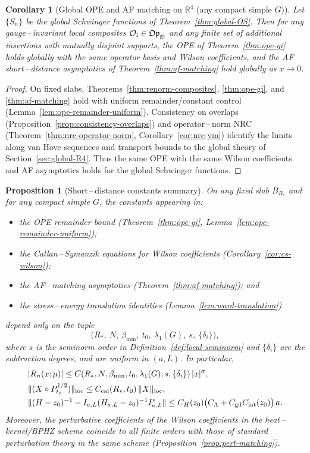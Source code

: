 \documentclass[11pt]{amsart}
\theoremstyle{plain}
\newtheorem{proposition}[theorem]{Proposition}
\newtheorem{corollary}[theorem]{Corollary}
\theoremstyle{definition}
\theoremstyle{remark}
\begin{document}
\begin{corollary}[Global OPE and AF matching on $\mathbb R^4$ (any compact simple $G$)]\label{cor:global-ope}
Let $\{S_n\}$ be the global Schwinger functions of Theorem~\ref{thm:global-OS}. Then for any gauge\,–\,invariant local composites $\mathcal O_i\in\mathfrak{Op}_{\rm gi}$ and any finite set of additional insertions with mutually disjoint supports, the OPE of Theorem~\ref{thm:ope-gi} holds globally with the same operator basis and Wilson coefficients, and the AF short\,–\,distance asymptotics of Theorem~\ref{thm:af-matching} hold globally as $x\to 0$.
\end{corollary}
\begin{proof}
On fixed slabs, Theorems~\ref{thm:renorm-composites}, \ref{thm:ope-gi}, and \ref{thm:af-matching} hold with uniform remainder/constant control (Lemma~\ref{lem:ope-remainder-uniform}). Consistency on overlaps (Proposition~\ref{prop:consistency-overlaps}) and operator\,–\,norm NRC (Theorem~\ref{thm:nrc-operator-norm}, Corollary~\ref{cor:nrc-ym}) identify the limits along van Hove sequences and transport bounds to the global theory of Section~\ref{sec:global-R4}. Thus the same OPE with the same Wilson coefficients and AF asymptotics holds for the global Schwinger functions.
\end{proof}

\begin{proposition}[Short\,–\,distance constants summary]\label{prop:sd-constants}
On any fixed slab $B_{R_*}$ and for any compact simple $G$, the constants appearing in:
\begin{itemize}
  \item the OPE remainder bound (Theorem~\ref{thm:ope-gi}, Lemma~\ref{lem:ope-remainder-uniform});
  \item the Callan\,–\,Symanzik equations for Wilson coefficients (Corollary~\ref{cor:cs-wilson});
  \item the AF\,–\,matching asymptotics (Theorem~\ref{thm:af-matching}); and
  \item the stress\,–\,energy translation identities (Lemma~\ref{lem:ward-translation})
\end{itemize}
depend only on the tuple
\[
  \big(R_*,\ N,\ \beta_{\min},\ t_0,\ \lambda_1(G),\ s,\ \{\delta_i\}\big),
\]
where $s$ is the seminorm order in Definition~\ref{def:local-seminorm} and $\{\delta_i\}$ are the subtraction degrees, and are uniform in $(a,L)$. In particular,
\begin{align*}
  &|R_n(x;\mu)| \le C(R_*,N,\beta_{\min},t_0,\lambda_1(G),s,\{\delta_i\})\, |x|^{\sigma},\\
  &\|(X\circ P_{t_0}^{1/2})\|_{\rm loc} \le C_{\rm cal}(R_*,t_0)\,\|X\|_{\rm loc},\\
  &\|(H-z_0)^{-1} - I_{a,L}(H_{a,L}-z_0)^{-1} I_{a,L}^*\| \le C_H(z_0)\big(C_\Lambda + C_{\rm gd} C_{\rm lat}(z_0)\big)\, a.
\end{align*}
Moreover, the perturbative coefficients of the Wilson coefficients in the heat\,–\,kernel/BPHZ scheme coincide to all finite orders with those of standard perturbation theory in the same scheme (Proposition~\ref{prop:pert-matching}).
\end{proposition}
\end{document}
